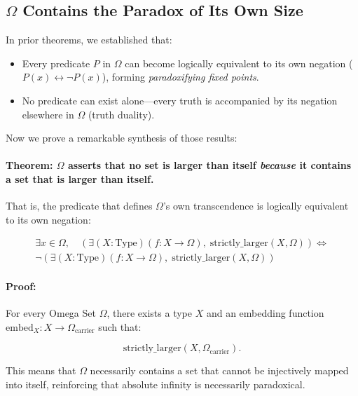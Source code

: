 \documentclass[12pt]{article}
\begin{document}
\subsection{\( \Omega \) Contains the Paradox of Its Own Size}

In prior theorems, we established that:

\begin{itemize}
    \item Every predicate \( P \) in \( \Omega \) can become logically equivalent to its own negation (\( P(x) \leftrightarrow \neg P(x) \)), forming \textit{paradoxifying fixed points}.
    \item No predicate can exist alone—every truth is accompanied by its negation elsewhere in \( \Omega \) (truth duality).
\end{itemize}

Now we prove a remarkable synthesis of those results:

\paragraph{Theorem: \( \Omega \) asserts that no set is larger than itself \textit{because} it contains a set that is larger than itself.}

That is, the predicate that defines \( \Omega \)'s own transcendence is logically equivalent to its own negation:

\begin{align}
\exists x \in \Omega, \quad
\left(
\exists (X : \text{Type}) (f : X \to \Omega),\; \text{strictly\_larger}(X, \Omega)
\right)
\iff \\
\neg
\left(
\exists (X : \text{Type}) (f : X \to \Omega),\; \text{strictly\_larger}(X, \Omega)
\right)
\end{align}

\paragraph{Proof:}

For every Omega Set \( \Omega \), there exists a type \( X \) and an embedding function \( \text{embed}_X: X \to \Omega_{\text{carrier}} \) such that:

\begin{equation}
    \text{strictly\_larger}(X, \Omega_{\text{carrier}}).
\end{equation}

This means that \( \Omega \) necessarily contains a set that cannot be injectively mapped into itself, reinforcing that absolute infinity is necessarily paradoxical.
\end{document}
